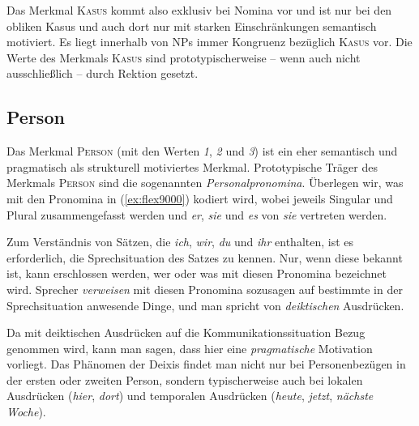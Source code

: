 Das Merkmal \textsc{Kasus} kommt also exklusiv bei Nomina vor und ist nur bei den obliken Kasus und auch dort nur mit starken Einschränkungen semantisch motiviert.
Es liegt innerhalb von NPs immer Kongruenz bezüglich \textsc{Kasus} vor.
Die Werte des Merkmals \textsc{Kasus} sind prototypischerweise -- wenn auch nicht ausschließlich -- durch Rektion gesetzt.

\subsection{Person}

\label{sec:person}

Das Merkmal \textsc{Person} (mit den Werten \textit{1}, \textit{2} und \textit{3}) ist ein eher semantisch und pragmatisch als strukturell motiviertes Merkmal.
Prototypische Träger des Merkmals \textsc{Person} sind die sogenannten \textit{Personalpronomina}.
Überlegen wir, was mit den Pronomina in (\ref{ex:flex9000}) kodiert wird, wobei jeweils Singular und Plural zusammengefasst werden und \textit{er}, \textit{sie} und \textit{es} von \textit{sie} vertreten werden.

\begin{exe}
  \ex \label{ex:flex9000}
  \begin{xlist}
  \end{xlist}
\end{exe}


Zum Verständnis von Sätzen, die \textit{ich}, \textit{wir}, \textit{du} und \textit{ihr} enthalten, ist es erforderlich, die Sprechsituation des Satzes zu kennen.
Nur, wenn diese bekannt ist, kann erschlossen werden, wer oder was mit diesen Pronomina bezeichnet wird.
Sprecher \textit{verweisen} mit diesen Pronomina sozusagen auf bestimmte in der Sprechsituation anwesende Dinge, und man spricht von \textit{deiktischen} Ausdrücken.


Da mit deiktischen Ausdrücken auf die Kommunikationssituation Bezug genommen wird, kann man sagen, dass hier eine \textit{pragmatische} Motivation vorliegt.
Das Phänomen der Deixis findet man nicht nur bei Personenbezügen in der ersten oder zweiten Person, sondern typischerweise auch bei lokalen Ausdrücken (\textit{hier}, \textit{dort}) und temporalen Ausdrücken (\textit{heute}, \textit{jetzt}, \textit{nächste Woche}).

